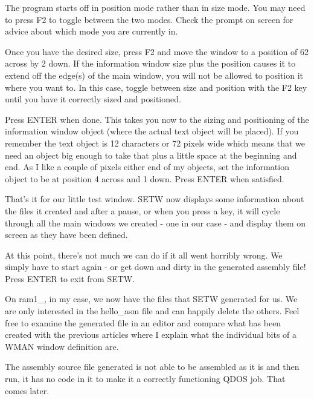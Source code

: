 The program starts off in position mode rather than in size mode. You
            may need to press F2 to toggle between the two modes. Check the prompt on
            screen for advice about which mode you are currently in.

Once you have the desired size, press F2 and move the window to a
            position of 62 across by 2 down. If the information window size plus the
            position causes it to extend off the edge(s) of the main window, you will not
            be allowed to position it where you want to. In this case, toggle between size
            and position with the F2 key until you have it correctly sized and
            positioned.

Press ENTER when done. This takes you now to the sizing and positioning
            of the information window object (where the actual text object will be
            placed). If you remember the text object is 12 characters or 72 pixels wide
            which means that we need an object big enough to take that plus a little space
            at the beginning and end. As I like a couple of pixels either end of my
            objects, set the information object to be at position 4 across and 1 down.
            Press ENTER when satisfied.

That's it for our little test window. SETW now displays some information
            about the files it created and after a pause, or when you press a key, it will
            cycle through all the main windows we created -{} one in our case -{} and display
            them on screen as they have been defined.

At this point, there's not much we can do if it all went horribly wrong.
            We simply have to start again -{} or get down and dirty in the generated
            assembly file! Press ENTER to exit from SETW.

On ram1\_, in my case, we now have the files that SETW generated for us.
            We are only interested in the hello\_asm file and can happily delete the
            others. Feel free to examine the generated file in an editor and compare what
            has been created with the previous articles where I explain what the
            individual bits of a WMAN window definition are.

The assembly source file generated is not able to be assembled as it is
            and then run, it has no code in it to make it a correctly functioning QDOS
            job. That comes later.

